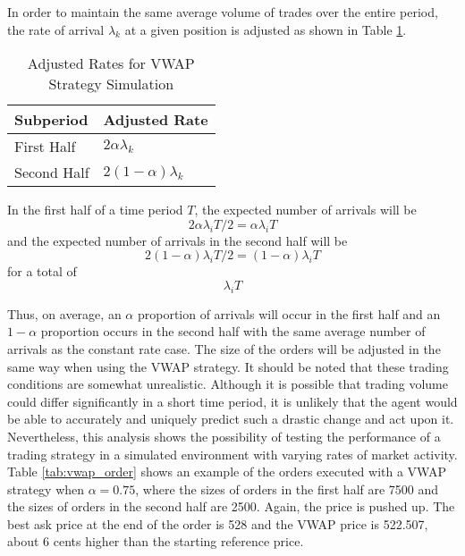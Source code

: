 In order to maintain the same average volume of trades over the entire period, the rate of arrival $\lambda_k$ at a given position is adjusted as shown in Table \ref{tab:adjusted_rates}.

\begin{table}[htbp]
\caption{Adjusted Rates for VWAP Strategy Simulation} \label{tab:adjusted_rates}
\begin{center}
\begin{tabular}{l|l}
\textbf{Subperiod}            & \textbf{Adjusted Rate}             \\
\hline
First Half  & $2 \alpha \lambda_k $    \\
Second Half & $2 (1 - \alpha) \lambda_k$
\end{tabular}
\end{center}
\end{table}

In the first half of a time period $T$, the expected number of arrivals will be 
$$2 \alpha \lambda_i T / 2 = \alpha \lambda_i T$$ 
and the expected number of arrivals in the second half will be 
$$2 (1-\alpha) \lambda_i T / 2 = (1-\alpha) \lambda_i T$$
for a total of $$\lambda_i T$$

Thus, on average, an $\alpha$ proportion of arrivals will occur in the first half and an $1-\alpha$ proportion occurs in the second half with the same average number of arrivals as the constant rate case. The size of the orders will be adjusted in the same way when using the VWAP strategy. It should be noted that these trading conditions are somewhat unrealistic. Although it is possible that trading volume could differ significantly in a short time period, it is unlikely that the agent would be able to accurately and uniquely predict such a drastic change and act upon it. Nevertheless, this analysis shows the possibility of testing the performance of a trading strategy in a simulated environment with varying rates of market activity. Table \ref{tab:vwap_order} shows an example of the orders executed with a VWAP strategy when $\alpha = 0.75$, where the sizes of orders in the first half are 7500 and the sizes of orders in the second half are 2500. Again, the price is pushed up. The best ask price at the end of the order is 528 and the VWAP price is 522.507, about 6 cents higher than the starting reference price.

